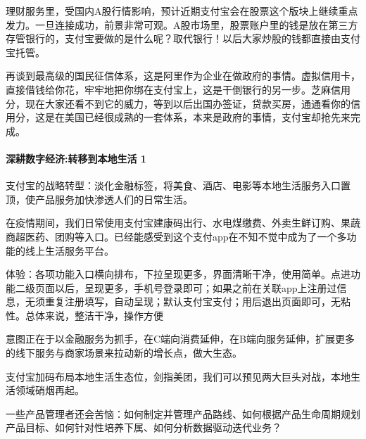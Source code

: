 \documentclass[letterpaper,10pt,english]{sphinxmanual}
\begin{document}
理财服务里，受国内A股行情影响，预计近期支付宝会在股票这个版块上继续重点发力。一旦连接成功，前景非常可观。A股市场里，股票账户里的钱是放在第三方存管银行的，支付宝要做的是什么呢？取代银行！以后大家炒股的钱都直接由支付宝托管。

再谈到最高级的国民征信体系，这是阿里作为企业在做政府的事情。虚拟信用卡，直接借钱给你花，牢牢地把你绑在支付宝上，这是干倒银行的另一步。芝麻信用分，现在大家还看不到它的威力，等到以后出国办签证，贷款买房，通通看你的信用分，这是在美国已经很成熟的一套体系，本来是政府的事情，支付宝却抢先来完成。


\paragraph{深耕数字经济:转移到本地生活 1\sphinxfootnotemark[992]}
\label{\detokenize{chapter_AI_company/alipay:id7}}%
\begin{footnotetext}[992]\sphinxAtStartFootnote
{}
%
\end{footnotetext}\ignorespaces 
支付宝的战略转型：淡化金融标签，将美食、酒店、电影等本地生活服务入口置顶，使产品服务加快渗透人们的日常生活。

在疫情期间，我们日常使用支付宝建康码出行、水电煤缴费、外卖生鲜订购、果蔬商超医药、团购等入口。已经能感受到这个支付app在不知不觉中成为了一个多功能的线上生活服务平台。

体验：各项功能入口横向排布，下拉呈现更多，界面清晰干净，使用简单。点进功能二级页面以后，呈现更多，手机号登录即可；如果之前在关联app上注册过信息，无须重复注册填写，自动呈现；默认支付宝支付；用后退出页面即可，无粘性。总体来说，整洁干净，操作方便
%
\begin{footnote}[993]\sphinxAtStartFootnote
{}
%
\end{footnote}

意图正在于以金融服务为抓手，在C端向消费延伸，在B端向服务延伸，扩展更多的线下服务与商家场景来拉动新的增长点，做大生态。

支付宝加码布局本地生活生态位，剑指美团，我们可以预见两大巨头对战，本地生活领域硝烟再起。

一些产品管理者还会苦恼：如何制定并管理产品路线、如何根据产品生命周期规划产品目标、如何针对性培养下属、如何分析数据驱动迭代业务？
\end{document}

